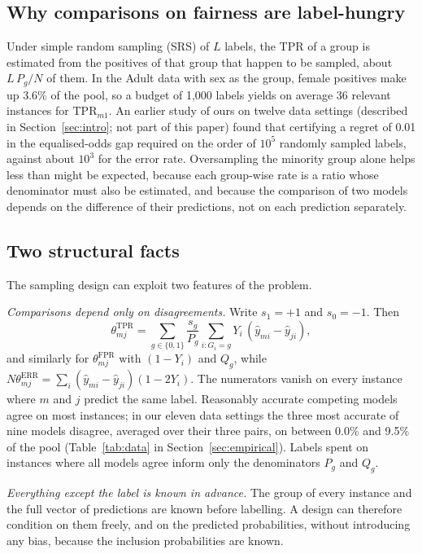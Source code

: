 \documentclass[pdflatex,sn-mathphys-num,iicol]{sn-jnl}
\theoremstyle{thmstyleone}
\theoremstyle{thmstyletwo}
\theoremstyle{thmstylethree}
\begin{document}
\subsection{Why comparisons on fairness are label-hungry}
Under simple random sampling (SRS) of $L$ labels, the TPR of a group is estimated from the positives of that group that happen to be sampled, about $L\,P_g/N$ of them. In the Adult data with sex as the group, female positives make up 3.6\% of the pool, so a budget of 1,000 labels yields on average 36 relevant instances for $\mathrm{TPR}_{m1}$. An earlier study of ours on twelve data settings (described in Section~\ref{sec:intro}; not part of this paper) found that certifying a regret of 0.01 in the equalised-odds gap required on the order of $10^5$ randomly sampled labels, against about $10^3$ for the error rate. Oversampling the minority group alone helps less than might be expected, because each group-wise rate is a ratio whose denominator must also be estimated, and because the comparison of two models depends on the difference of their predictions, not on each prediction separately.

\subsection{Two structural facts}
The sampling design can exploit two features of the problem.

\emph{Comparisons depend only on disagreements.} Write $s_1=+1$ and $s_0=-1$. Then
\begin{equation}\label{eq:identity}
\theta^{\mathrm{TPR}}_{mj}=\sum_{g\in\{0,1\}} \frac{s_g}{P_g}\sum_{i:G_i=g} Y_i\,(\hat y_{mi}-\hat y_{ji}),
\end{equation}
and similarly for $\theta^{\mathrm{FPR}}_{mj}$ with $(1-Y_i)$ and $Q_g$, while $N\theta^{\mathrm{ERR}}_{mj}=\sum_i(\hat y_{mi}-\hat y_{ji})(1-2Y_i)$. The numerators vanish on every instance where $m$ and $j$ predict the same label. Reasonably accurate competing models agree on most instances; in our eleven data settings the three most accurate of nine models disagree, averaged over their three pairs, on between 0.0\% and 9.5\% of the pool (Table~\ref{tab:data} in Section~\ref{sec:empirical}). Labels spent on instances where all models agree inform only the denominators $P_g$ and $Q_g$.

\emph{Everything except the label is known in advance.} The group of every instance and the full vector of predictions are known before labelling. A design can therefore condition on them freely, and on the predicted probabilities, without introducing any bias, because the inclusion probabilities are known.
\end{document}
